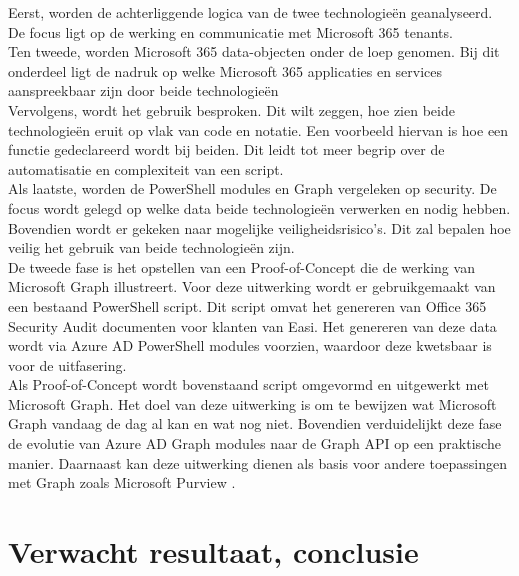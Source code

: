 Eerst, worden de achterliggende logica van de twee technologieën geanalyseerd. De focus ligt op de werking en communicatie met Microsoft 365 tenants. \\

Ten tweede, worden Microsoft 365 data-objecten onder de loep genomen. Bij dit onderdeel ligt de nadruk op welke Microsoft 365 applicaties en services aanspreekbaar zijn door beide technologieën \\

Vervolgens, wordt het gebruik besproken. Dit wilt zeggen, hoe zien beide technologieën eruit op vlak van code en notatie. Een voorbeeld hiervan is hoe een functie gedeclareerd wordt bij beiden. Dit leidt tot meer begrip over de automatisatie en complexiteit van een script. \\

Als laatste, worden de PowerShell modules en Graph vergeleken op security. De focus wordt gelegd op welke data beide technologieën verwerken en nodig hebben. Bovendien wordt er gekeken naar mogelijke veiligheidsrisico's. Dit zal bepalen hoe veilig het gebruik van beide technologieën zijn. \\

De tweede fase is het opstellen van een Proof-of-Concept die de werking van Microsoft Graph illustreert. Voor deze uitwerking wordt er gebruikgemaakt van een bestaand PowerShell script. Dit script omvat het genereren van Office 365 Security Audit documenten voor klanten van Easi. Het genereren van deze data wordt via Azure AD PowerShell modules voorzien, waardoor deze kwetsbaar is voor de uitfasering. \\

Als Proof-of-Concept wordt bovenstaand script omgevormd en uitgewerkt met Microsoft Graph. Het doel van deze uitwerking is om te bewijzen wat Microsoft Graph vandaag de dag al kan en wat nog niet. Bovendien verduidelijkt deze fase de evolutie van Azure AD Graph modules naar de Graph API op een praktische manier. Daarnaast kan deze uitwerking dienen als basis voor andere toepassingen met Graph zoals Microsoft Purview \autocite{Microsoft2023V}. 

\section{Verwacht resultaat, conclusie}%
\label{sec:verwachte_resultaten}


